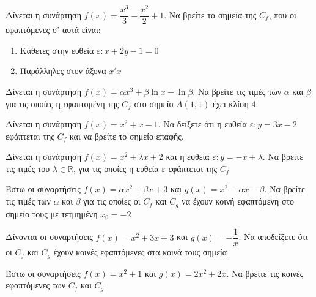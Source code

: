 \documentclass{presentation}
\begin{document}
\begin{askisi}
  Δίνεται η συνάρτηση $f(x)=\dfrac{x^3}{3}-\dfrac{x^2}{2}+1$. Να βρείτε τα σημεία της $C_f$, που οι εφαπτόμενες σ' αυτά είναι:
  \begin{enumerate}
    \item<1-> Κάθετες στην ευθεία $ε:x+2y-1=0$
    \item<2-> Παράλληλες στον άξονα $x'x$
  \end{enumerate}

\end{askisi}

\begin{askisi}
  Δίνεται η συνάρτηση $f(x)=αx^3+β\ln x-\ln β$. Να βρείτε τις τιμές των $α$ και $β$ για τις οποίες η εφαπτομένη της $C_f$ στο σημείο $Α(1,1)$ έχει κλίση $4$.

\end{askisi}

\begin{askisi}
  Δίνεται η συνάρτηση $f(x)=x^2+x-1$. Να δείξετε ότι η ευθεία $ε:y=3x-2$ εφάπτεται της $C_f$ και να βρείτε το σημείο επαφής.

\end{askisi}

\begin{askisi}
  Δίνεται η συνάρτηση $f(x)=x^2+λx+2$ και η ευθεία $ε:y=-x+λ$. Να βρείτε τις τιμές του $λ\in\mathbb{R}$, για τις οποίες η ευθεία $ε$ εφάπτεται της $C_f$

\end{askisi}

\begin{askisi}
  Έστω οι συναρτήσεις $f(x)=αx^2+βx+3$ και $g(x)=x^2-αx-β$. Να βρείτε τις τιμές των $α$ και $β$ για τις οποίες οι $C_f$ και $C_g$ να έχουν κοινή εφαπτόμενη στο σημείο τους με τετμημένη $x_0=-2$

\end{askisi}

\begin{askisi}
  Δίνονται οι συναρτήσεις $f(x)=x^2+3x+3$ και $g(x)=-\dfrac{1}{x}$. Να αποδείξετε ότι οι $C_f$ και $C_g$ έχουν κοινές εφαπτόμενες στα κοινά τους σημεία

\end{askisi}

\begin{askisi}
  Έστω οι συναρτήσεις $f(x)=x^2+1$ και $g(x)=2x^2+2x$. Να βρείτε τις κοινές εφαπτόμενες των $C_f$ και $C_g$

\end{askisi}
\end{document}
